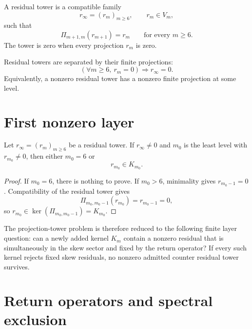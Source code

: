 \begin{definition}
\label{def:axiszeckendorf-residual-tower}
A residual tower is a compatible family
$$
r_\infty=(r_m)_{m\geq 6},
\qquad
r_m\in V_m,
$$
such that
$$
\Pi_{m+1,m}(r_{m+1})=r_m
\qquad
\text{for every }m\geq 6.
$$
The tower is zero when every projection $r_m$ is zero.
\end{definition}

\begin{principle}
\label{prin:axiszeckendorf-projection-separation}
Residual towers are separated by their finite projections:
$$
\left(\forall m\geq 6,\ r_m=0\right)
\Longrightarrow
r_\infty=0.
$$
Equivalently, a nonzero residual tower has a nonzero finite projection at
some level.
\end{principle}

\section{First nonzero layer}
\label{sec:axiszeckendorf-first-nonzero-layer}

\begin{proposition}
\label{prop:axiszeckendorf-first-nonzero-layer-kernel}
Let $r_\infty=(r_m)_{m\geq6}$ be a residual tower.  If $r_\infty\neq0$ and
$m_0$ is the least level with $r_{m_0}\neq0$, then either $m_0=6$ or
$$
r_{m_0}\in K_{m_0}.
$$
\end{proposition}

\begin{proof}
If $m_0=6$, there is nothing to prove.  If $m_0>6$, minimality gives
$r_{m_0-1}=0$.  Compatibility of the residual tower gives
$$
\Pi_{m_0,m_0-1}(r_{m_0})=r_{m_0-1}=0,
$$
so $r_{m_0}\in\ker(\Pi_{m_0,m_0-1})=K_{m_0}$.
\end{proof}

\begin{principle}
\label{prin:axiszeckendorf-layer-kernel-induction-target}
The projection-tower problem is therefore reduced to the following finite
layer question: can a newly added kernel $K_m$ contain a nonzero residual
that is simultaneously in the skew sector and fixed by the return operator?
If every such kernel rejects fixed skew residuals, no nonzero admitted
counter residual tower survives.
\end{principle}

\section{Return operators and spectral exclusion}
\label{sec:axiszeckendorf-return-operators-spectral-exclusion}

